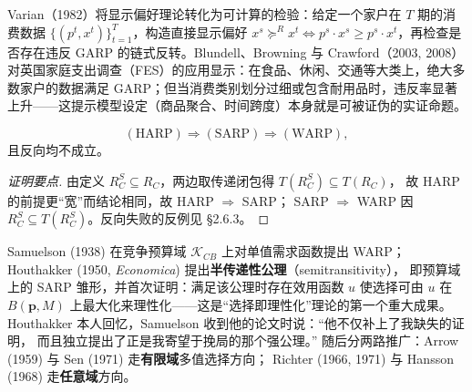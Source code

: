 \begin{example}
Varian（1982）将显示偏好理论转化为可计算的检验：给定一个家户在 $T$ 期的消费数据 $\{(p^t,x^t)\}_{t=1}^T$，构造直接显示偏好 $x^s\succeq^R x^t \iff p^s\cdot x^s\ge p^s\cdot x^t$，再检查是否存在违反 GARP 的链式反转。Blundell、Browning 与 Crawford（2003, 2008）对英国家庭支出调查（FES）的应用显示：在食品、休闲、交通等大类上，绝大多数家户的数据满足 GARP；但当消费类别划分过细或包含耐用品时，违反率显著上升——这提示模型设定（商品聚合、时间跨度）本身就是可被证伪的实证命题。
\end{example}

\begin{proposition}[逻辑强度]
\[
(\mathrm{HARP}) \Rightarrow (\mathrm{SARP}) \Rightarrow (\mathrm{WARP}),
\]
且反向均不成立。
\end{proposition}

\begin{proof}[证明要点]
由定义 $R_C^S\subseteq R_C$，两边取传递闭包得 $T(R_C^S)\subseteq T(R_C)$，
故 HARP 的前提更“宽”而结论相同，故 HARP $\Rightarrow$ SARP；
SARP $\Rightarrow$ WARP 因 $R_C^S\subseteq T(R_C^S)$。反向失败的反例见 §2.6.3。
\end{proof}

\begin{remark}[历史坐标]
Samuelson (1938) 在竞争预算域 $\mathcal{K}_{CB}$ 上对单值需求函数提出 WARP；
Houthakker (1950, \emph{Economica}) 提出\textbf{半传递性公理}（semitransitivity），
即预算域上的 SARP 雏形，并首次证明：满足该公理时存在效用函数 $u$ 使选择可由
$u$ 在 $B(\boldsymbol{p},M)$ 上最大化来理性化——这是“选择即理性化”理论的第一个重大成果。
Houthakker 本人回忆，Samuelson 收到他的论文时说：“他不仅补上了我缺失的证明，
而且独立提出了正是我寄望于挽局的那个强公理。”
随后分两路推广：Arrow (1959) 与 Sen (1971) 走\textbf{有限域}多值选择方向；
Richter (1966, 1971) 与 Hansson (1968) 走\textbf{任意域}方向。
\end{remark}

